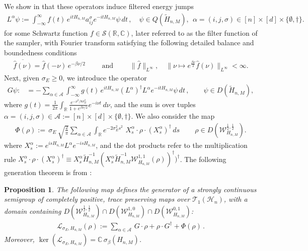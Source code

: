 \documentclass[11pt]{amsart}
\newcommand{\1}{\mathbbm{1}}
\newcommand{\cH}{\mathcal{H}}
\newcommand{\cL}{\mathcal{L}}
\theoremstyle{plain}
\newtheorem{proposition}[theorem]{Proposition}
\theoremstyle{definition}
\theoremstyle{remark}
\numberwithin{equation}{section}
\begin{document}
 We show in \cite[Proposition 4.3]{BeckerRouzeSalzmannToAppearcmp} that these operators induce filtered energy jumps
\begin{align}\label{jumpLalpha}
L^\alpha{\psi}:=\int_{-\infty}^\infty f(t) \,e^{itH_{n,M}}a^\sigma_{ij} e^{-itH_{n,M}}{\psi}\,dt\,,\quad
{\psi}\in Q(\widetilde{H}_{n,M}), ~~\alpha=(i,j,\sigma)\in [n]\times [d]\times \{\emptyset,\dagger\}.
\end{align}
for some Schwartz function $f\in\mathcal{S}(\mathbb{R},\mathbb{C})$, later referred to as the filter function of the sampler, with Fourier transform  satisfying the following detailed balance and boundedness conditions
\begin{align}
\label{eq:KMSFilterFunction}
\overline{\widehat{f}(\nu)}=\widehat{f}(-\nu)\,e^{-\beta\nu/2}\qquad \text{ and }\qquad \|\widehat{f}\|_{L^\infty},\quad  \|\nu\mapsto e^{\frac{\beta\nu}{2}}\widehat{f}(\nu)\|_{L^\infty} <\infty.
\end{align}
Next, given $\sigma_E\ge 0$, we introduce the operator  
\begin{align}\label{intrepGGG}
 G\psi:
&=-\sum_{\alpha\in\mathcal{A}}\int_{-\infty}^\infty g(t)\,e^{itH_{n,M}}(L^\alpha)^\dagger L^\alpha e^{-itH_{n,M}}{\psi}\,dt\,,\qquad {\psi}\in D(\widetilde{H}_{n,M}),
\end{align}
where $g(t)=\frac{1}{2\pi}\int_{\mathbb R}
\frac{e^{-\nu^2/8\sigma_E^2}}{1+e^{\beta\nu/2}}
e^{-i\nu t}\,d\nu$, and the sum is over tuples $\alpha=(i,j,\sigma)\in \mathcal{A}:=[n]\times[d]\times\{\emptyset,\dagger\}$. We also consider the map
\begin{align}\label{Phimapintrep}
\Phi(\rho):=\,
\sigma_E\,\sqrt{\frac{2}{\pi}}\sum_{\alpha\in\mathcal{A}}\int_{\mathbb{R}}e^{-2\sigma_E^2 s^2}\, \, X^{\alpha}_s \cdot \rho \cdot  (X_s^\alpha)^\dagger \,ds\,\qquad \rho\in D(\mathcal{W}_{H_{n,M}}^{\frac{1}{2},\frac{1}{2}}).
\end{align}
where $X^{\alpha}_s:=e^{isH_{n,M}}L^\alpha e^{-isH_{n,M}}$, and the dot products refer to the multiplication rule 
$X_s^\alpha\cdot \rho\cdot (X_s^\alpha)^\dagger \equiv X_s^\alpha\widetilde{H}_{n,M}^{-1}(X^\alpha_s\widetilde{H}_{n,M}^{-1}\mathcal{W}_{H_{n,M}}^{1,1}(\rho))^\dagger)^\dagger$. The following generation theorem is from \cite{BeckerRouzeSalzmannToAppearcmp}:



\begin{proposition}\cite[Theorem 2.1 and Corollary 4.4]{BeckerRouzeSalzmannToAppearcmp}
\label{condpropdefsampler}
 The following map defines the generator of a strongly continuous semigroup of completely positive, trace preserving maps over $\mathscr{T}_1(\cH_n)$, with a domain containing $D(\mathcal W_{H_{n,M}}^{\frac{1}{2},\frac{1}{2}}) \cap D(\mathcal W_{H_{n,M}}^{1,0}) \cap D(\mathcal W_{H_{n,M}}^{0,1})$:  
\begin{align}
\mathcal L_{\sigma_E,H_{n,M}}(\rho):=
\sum_{\alpha\in\mathcal{A}}\, G\cdot \rho+\rho\cdot G^\dagger +\Phi(\rho)\,.
\nonumber
\end{align}
Moreover, $\operatorname{ker}(\cL_{\sigma_E,H_{n,M}})=\mathbb{C}\, \sigma_\beta(H_{n,M})$.
\end{proposition}
\end{document}
